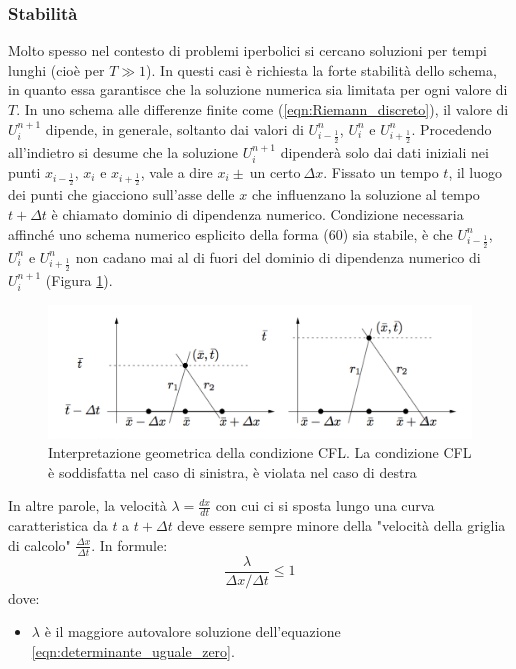 \documentclass[12pt]{article} %
\begin{document}
\subsubsection{Stabilità}
\noindent Molto spesso nel contesto di problemi iperbolici si cercano soluzioni per tempi lunghi (cioè per $T\gg1$). In questi casi è richiesta la forte stabilità dello schema, in quanto essa garantisce che la soluzione numerica sia limitata per ogni valore di $T$. In uno schema alle differenze finite come (\ref{eqn:Riemann_discreto}), il valore di $U_i^{n+1}$ dipende, in generale, soltanto dai valori di $U^{n}_{i-\frac{1}{2}}$, $U^{n}_{i}$ e $U^{n}_{i+\frac{1}{2}}$. Procedendo all'indietro si desume che la soluzione $U_i^{n+1}$ dipenderà solo dai dati iniziali nei punti $x_{i-\frac{1}{2}}$, $x_i$ e $x_{i+\frac{1}{2}}$, vale a dire $x_i\pm\:\textrm{un certo}\:\Delta x$. Fissato un tempo $t$, il luogo dei punti che giacciono sull'asse delle $x$ che influenzano la soluzione al tempo $t+\Delta t$ è chiamato dominio di dipendenza numerico. Condizione necessaria affinché uno schema numerico esplicito della forma (60) sia stabile, è che $U^{n}_{i-\frac{1}{2}}$, $U^{n}_{i}$ e $U^{n}_{i+\frac{1}{2}}$ non cadano mai al di fuori del dominio di dipendenza numerico di $U_i^{n+1}$ (Figura \ref{fig:CFL}). 
\begin{figure}
    \centering
    \includegraphics[width=\textwidth]{CFL.png}
    \caption{Interpretazione geometrica della condizione CFL. La condizione CFL è soddisfatta nel caso di sinistra, è violata nel caso di destra}
    \label{fig:CFL}
\end{figure}
\noindent In altre parole, la velocità $\lambda=\frac{dx}{dt}$ con cui ci si sposta lungo una curva caratteristica da $t$ a $t+\Delta t$ deve essere sempre minore della "velocità della griglia di calcolo" $\frac{\Delta x}{\Delta t}$. In formule:
\begin{equation}
    \frac{\lambda}{\Delta x/\Delta t}\leq1
    \label{eqn:Courant}
\end{equation}
\noindent dove:
\begin{itemize}
    \item $\lambda$ è il maggiore autovalore soluzione dell'equazione \ref{eqn:determinante_uguale_zero}.
\end{itemize}
\end{document}
